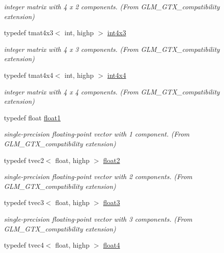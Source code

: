 \begin{DoxyCompactItemize}
\begin{DoxyCompactList}\small\item\em integer matrix with 4 x 2 components. (From G\+L\+M\+\_\+\+G\+T\+X\+\_\+compatibility extension) \end{DoxyCompactList}\item 
typedef tmat4x3$<$ int, highp $>$ \hyperlink{group__gtx__compatibility_ga08b035f86b94428f5913e48a4a074e97}{int4x3}
\begin{DoxyCompactList}\small\item\em integer matrix with 4 x 3 components. (From G\+L\+M\+\_\+\+G\+T\+X\+\_\+compatibility extension) \end{DoxyCompactList}\item 
typedef tmat4x4$<$ int, highp $>$ \hyperlink{group__gtx__compatibility_ga1e72ab0f7e57aae3d07ef8880c11d8b7}{int4x4}
\begin{DoxyCompactList}\small\item\em integer matrix with 4 x 4 components. (From G\+L\+M\+\_\+\+G\+T\+X\+\_\+compatibility extension) \end{DoxyCompactList}\item 
typedef float \hyperlink{group__gtx__compatibility_gae0ad1b0450320cda98bbbecb56bc3167}{float1}
\begin{DoxyCompactList}\small\item\em single-\/precision floating-\/point vector with 1 component. (From G\+L\+M\+\_\+\+G\+T\+X\+\_\+compatibility extension) \end{DoxyCompactList}\item 
typedef tvec2$<$ float, highp $>$ \hyperlink{group__gtx__compatibility_ga3174e387d3b89c5dcff485c4e665a68c}{float2}
\begin{DoxyCompactList}\small\item\em single-\/precision floating-\/point vector with 2 components. (From G\+L\+M\+\_\+\+G\+T\+X\+\_\+compatibility extension) \end{DoxyCompactList}\item 
typedef tvec3$<$ float, highp $>$ \hyperlink{group__gtx__compatibility_ga25f20d2c12f9b5f3917467e92899ea5a}{float3}
\begin{DoxyCompactList}\small\item\em single-\/precision floating-\/point vector with 3 components. (From G\+L\+M\+\_\+\+G\+T\+X\+\_\+compatibility extension) \end{DoxyCompactList}\item 
typedef tvec4$<$ float, highp $>$ \hyperlink{group__gtx__compatibility_ga05e1940d91deb4bbe819881bf65dc52d}{float4}

\end{DoxyCompactItemize}

